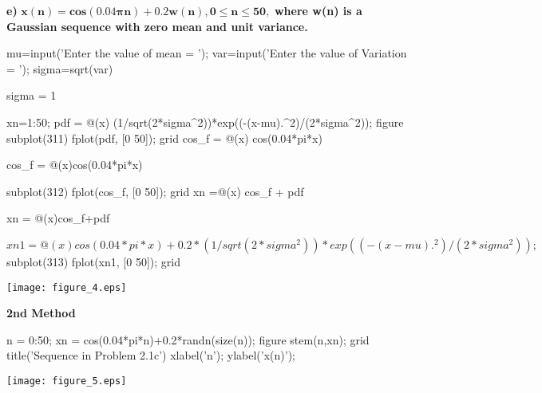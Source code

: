\documentclass[12pt, onecolumn]{IEEEtran}
\begin{document}
	\begin{par}
		\begin{flushleft}
			\textbf{e)} $\mathbf{x(n) = cos(0.04\pi n) + 0.2w(n), 0 \leq  n \leq 50,}$ \textbf{where w(n) is a Gaussian sequence with zero mean and unit variance.}
		\end{flushleft}
	\end{par}
	
	\begin{matlabcode}
		mu=input('Enter the value of mean = ');
		var=input('Enter the value of Variation = ');
		sigma=sqrt(var)
	\end{matlabcode}
	\begin{matlaboutput}
		sigma = 1
	\end{matlaboutput}
	\begin{matlabcode}
		xn=1:50;
		pdf = @(x) (1/sqrt(2*sigma^2))*exp((-(x-mu).^2)/(2*sigma^2));
		figure
		subplot(311)
		fplot(pdf,  [0 50]); grid
		cos_f = @(x) cos(0.04*pi*x)
	\end{matlabcode}
	\begin{matlaboutput}
		cos_f = 
		@(x)cos(0.04*pi*x)
		
	\end{matlaboutput}
	\begin{matlabcode}
		subplot(312)
		fplot(cos_f, [0 50]); grid
		xn =@(x) cos_f + pdf
	\end{matlabcode}
	\begin{matlaboutput}
		xn = 
		@(x)cos_f+pdf
		
	\end{matlaboutput}
	\begin{matlabcode}
		$xn1 =@(x) cos(0.04*pi*x) + 0.2*(1/sqrt(2*sigma^2))*exp((-(x-mu).^2)/(2*sigma^2));$
		subplot(313)
		fplot(xn1, [0 50]); grid
	\end{matlabcode}
	\begin{center}
		\texttt{[image: figure\_4.eps]}
	\end{center}
	
	\begin{par}
		\begin{flushleft}
			\textbf{2nd Method}
		\end{flushleft}
	\end{par}
	
	\begin{matlabcode}
		n = 0:50; 
		xn = cos(0.04*pi*n)+0.2*randn(size(n));
		figure
		stem(n,xn); grid
		title('Sequence in Problem 2.1c')
		xlabel('n'); 
		ylabel('x(n)');
	\end{matlabcode}
	\begin{center}
		\texttt{[image: figure\_5.eps]}
	\end{center}
	
\end{document}
